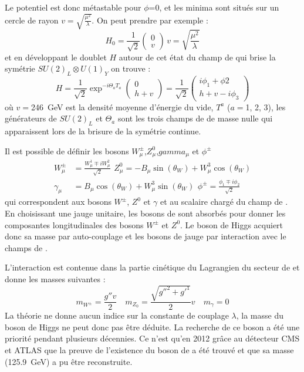 Le potentiel est donc métastable pour $\phi$=0, et les minima sont situés sur un cercle de rayon $v=\sqrt{\frac{\mu^{2}}{\lambda}}$. On peut prendre par exemple :
\begin{equation}
H_{0}=\frac{1}{\sqrt{2}}\begin{pmatrix} 
0\\
v
\end{pmatrix} \, v=\sqrt{\frac{\mu^{2}}{\lambda}}
\end{equation}
et en développant le doublet $H$ autour de cet état du champ de  qui brise la symétrie $SU(2)_{L}\otimes U(1)_{Y}$ on trouve : 
\begin{equation}
H=\frac{1}{\sqrt{2}}\exp^{-i\Theta_{a}T_{a}}\begin{pmatrix} 
0\\
h+v
\end{pmatrix}=\frac{1}{\sqrt{2}}\begin{pmatrix} 
i\phi_{1}+\phi{2}\\
h+v-i\phi_{3}
\end{pmatrix}
\end{equation}
où $v=$\SI{246}{\giga\eV} est la densité moyenne d'énergie du vide, $T^{a}$ ($a=$\num{1}, \num{2}, \num{3}), les générateurs de $SU(2)_{L}$ et $\Theta_{a}$ sont les trois champs de  de masse nulle qui apparaissent lors de la brisure de la symétrie continue.

Il est possible de définir les bosons $W_{\mu}^{\pm}$,$Z_{\mu}^{0}$,$gamma_{\mu}$ et $\phi^{\pm}$ 
\begin{equation}
\begin{split}
W_{\mu}^{\pm}&=\frac{W_{\mu}^{1}\mp iW_{\mu}^{2}}{\sqrt{2}}\, \ Z_{\mu}^{0}=-B_{\mu}\sin(\theta_{W})+W_{\mu}^{3}\cos(\theta_{W})\\
\gamma_{\mu}&=B_{\mu}\cos(\theta_{W})+W_{\mu}^{3}\sin(\theta_{W})\, \ \phi^{\pm}=\frac{\phi_{1}\mp i\phi_{2}}{\sqrt{2}}
\end{split}
\end{equation}
qui correspondent aux bosons $W^{\pm}$, $Z^{0}$ et $\gamma$ et au scalaire chargé du champ de . En choisissant une jauge unitaire, les bosons de  sont absorbés pour donner les composantes longitudinales des bosons $W^{\pm}$ et $Z^{0}$. Le boson de Higgs acquiert donc sa masse par auto-couplage et les bosons de jauge par interaction avec le champs de .

L'interaction est contenue dans la partie cinétique du Lagrangien du secteur de  et donne les masses suivantes : 
\begin{equation}
m_{W^{\pm}}=\frac{g''v}{2} \quad m_{Z_{0}}=\frac{\sqrt{g''^{2}+g'^{1}}}{2}v \quad m_{\gamma}=0 
\end{equation} 
La théorie ne donne aucun indice sur la constante de couplage $\lambda$, la masse du boson de Higgs ne peut donc pas être déduite. La recherche de ce boson a été une priorité pendant plusieurs décennies. Ce n'est qu'en \num{2012} grâce au détecteur CMS et ATLAS que la preuve de l'existence du boson de  a été trouvé et que sa masse (\SI{125.9}{\giga\eV}) a pu être reconstruite. 


